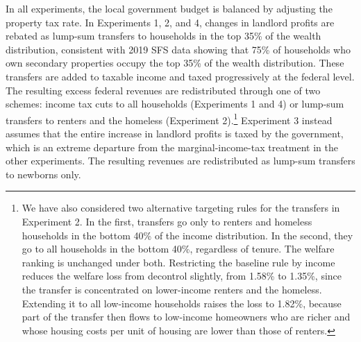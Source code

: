 \documentclass[parskip=full]{article}
\begin{document}
In all experiments, the local government budget is balanced by adjusting the property tax rate. In Experiments 1, 2, and 4, changes in landlord profits are rebated as lump-sum transfers to households in the top 35\% of the wealth distribution, consistent with 2019 SFS data showing that 75\% of households who own secondary properties occupy the top 35\% of the wealth distribution. These transfers are added to taxable income and taxed progressively at the federal level. The resulting excess federal revenues are redistributed through one of two schemes: income tax cuts to all households (Experiments 1 and 4) or lump-sum transfers to renters and the homeless (Experiment 2).\footnote{We have also considered two alternative targeting rules for the transfers in Experiment 2. In the first, transfers go only to renters and homeless households in the bottom 40\% of the income distribution. In the second, they go to all households in the bottom 40\%, regardless of tenure. The welfare ranking is unchanged under both. Restricting the baseline rule by income reduces the welfare loss from decontrol slightly, from 1.58\% to 1.35\%, since the transfer is concentrated on lower-income renters and the homeless. Extending it to all low-income households raises the loss to 1.82\%, because part of the transfer then flows to low-income homeowners who are richer and whose housing costs per unit of housing are lower than those of renters.} Experiment 3 instead assumes that the entire increase in landlord profits is taxed by the government, which is an extreme departure from the marginal-income-tax treatment in the other experiments. The resulting revenues are redistributed as lump-sum transfers to newborns only.
\end{document}
